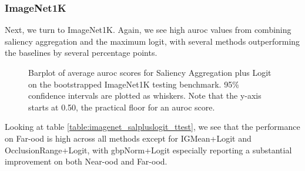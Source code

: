 \documentclass[UKenglish]{uiomasterthesis} %
\theoremstyle{definition}
\begin{document}
\newpage

\subsubsection{ImageNet1K}

Next, we turn to ImageNet1K. Again, we see high \ac{auroc} values from combining saliency aggregation and the maximum logit, with several methods outperforming the baselines by several percentage points.

\begin{figure}[hbtp]
    \begin{center}
        
    \end{center}
    \caption[ImageNet200 Saliency Aggregation plus Logit Bootstrap]{Barplot of average \ac{auroc} scores for Saliency Aggregation plus Logit on the bootstrapped ImageNet1K testing benchmark. 95\% confidence intervals are plotted as whiskers. Note that the y-axis starts at 0.50, the practical floor for an \ac{auroc} score.}
    \label{fig:imagenet_salpluslogit_bootstrap_barplot}
\end{figure}

Looking at table \ref{table:imagenet_salpluslogit_ttest}, we see that the performance on Far-\ac{ood} is high across all methods except for IGMean+Logit and OcclusionRange+Logit, with \ac{gbp}Norm+Logit especially reporting a substantial improvement on both Near-\ac{ood} and Far-\ac{ood}. 
\end{document}
